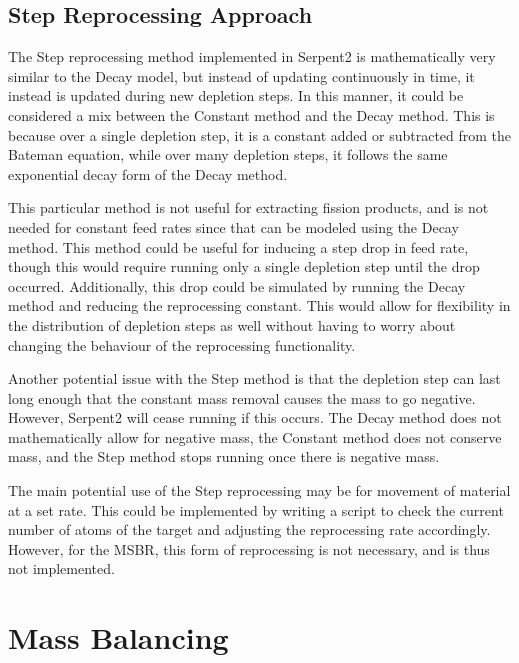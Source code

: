 
\subsection{Step Reprocessing Approach}

The Step reprocessing method implemented in Serpent2 is mathematically very similar to the Decay model, but instead of updating continuously in time, it instead is updated during new depletion steps. In this manner, it could be considered a mix between the Constant method and the Decay method. This is because over a single depletion step, it is a constant added or subtracted from the Bateman equation, while over many depletion steps, it follows the same exponential decay form of the Decay method.

This particular method is not useful for extracting fission products, and is not needed for constant feed rates since that can be modeled using the Decay method. This method could be useful for inducing a step drop in feed rate, though this would require running only a single depletion step until the drop occurred. Additionally, this drop could be simulated by running the Decay method and reducing the reprocessing constant. This would allow for flexibility in the distribution of depletion steps as well without having to worry about changing the behaviour of the reprocessing functionality.

Another potential issue with the Step method is that the depletion step can last long enough that the constant mass removal causes the mass to go negative. However, Serpent2 will cease running if this occurs. The Decay method does not mathematically allow for negative mass, the Constant method does not conserve mass, and the Step method stops running once there is negative mass.

The main potential use of the Step reprocessing may be for movement of material at a set rate. This could be implemented by writing a script to check the current number of atoms of the target and adjusting the reprocessing rate accordingly. However, for the MSBR, this form of reprocessing is not necessary, and is thus not implemented.

\section{Mass Balancing}
\label{s:mass-bal-meth}

